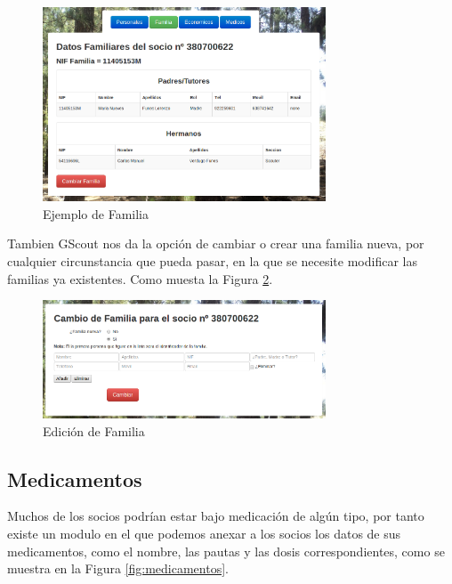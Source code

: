 \begin{figure}[H]
\begin{center}
\includegraphics[width=0.75\textwidth]{images/familia_socio.jpg}
\caption{Ejemplo de Familia}
\label{fig:familia}
\end{center}
\end{figure}

Tambien GScout nos da la opción de cambiar o crear una familia nueva, por cualquier circunstancia que pueda pasar, en la que se necesite modificar las familias ya existentes.
Como muesta la Figura \ref{fig:edit_familia}.\\

\begin{figure}[H]
\begin{center}
\includegraphics[width=0.75\textwidth]{images/cambio_familia.jpg}
\caption{Edición de Familia}
\label{fig:edit_familia}
\end{center}
\end{figure}


\subsection{Medicamentos}

Muchos de los socios podrían estar bajo medicación de algún tipo, por tanto existe un modulo en el que podemos anexar a los socios los datos de sus medicamentos, como el nombre, las pautas y las dosis correspondientes, 
como se muestra en la Figura \ref{fig:medicamentos}.\\

